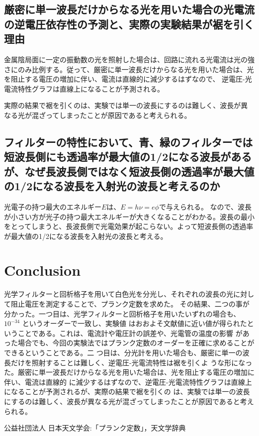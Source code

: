 \documentclass[a4paper,12pt]{jsarticle}
\begin{document}
\subsection{厳密に単一波長だけからなる光を用いた場合の光電流の逆電圧依存性の予測と、実際の実験結果が裾を引く理由}
金属陰局面に一定の振動数の光を照射した場合は、回路に流れる光電流は光の強さにのみ比例する。従って、厳密に単一波長だけからなる光を用いた場合は、光を阻止する電圧の増加に伴い、電流は直線的に減少するはずなので、
逆電圧-光電流特性グラフは直線上になることが予測される。

実際の結果で裾を引くのは、実験では単一の波長にするのは難しく、波長が異なる光が混ざってしまったことが原因であると考えられる。
\subsection{フィルターの特性において、青、緑のフィルターでは短波長側にも透過率が最大値の1/2になる波長があるが、なぜ長波長側ではなく短波長側の透過率が最大値の1/2になる波長を入射光の波長と考えるのか}
光電子の持つ最大のエネルギー$E$は、$E = h\nu = e\phi $で与えられる。
なので、波長が小さい方が光子の持つ最大エネルギーが大きくなることがわかる。波長の最小をとってしまうと、長波長側で光電効果が起こらない。よって短波長側の透過率が最大値の1/2になる波長を入射光の波長と考える。

\section{Conclusion}
光学フィルターと回析格子を用いて白色光を分光し、それぞれの波長の光に対して阻止電圧を測定することで、プランク定数を求めた。
その結果、二つの事が分かった。一つ目は、光学フィルターと回析格子を用いたいずれの場合も、$10^{-34}$ というオーダーで一致し、実験値
はおおよそ文献値に近い値が得られたということである。これは、電流計や電圧計の誤差や、光電管の温度の影響
があった場合でも、今回の実験法ではプランク定数のオーダーを正確に求めることができるということである。二
つ目は、分光計を用いた場合も、厳密に単一の波長だけを照射することは難しく、逆電圧-光電流特性は裾を引くよ
うな形になった。厳密に単一波長だけからなる光を用いた場合は、光を阻止する電圧の増加に伴い、電流は直線的
に減少するはずなので、逆電圧-光電流特性グラフは直線上になることが予測されるが、実際の結果で裾を引くの
は、実験では単一の波長にするのは難しく、波長が異なる光が混ざってしまったことが原因であると考えられる。
\begin{thebibliography}{文献数}
 公益社団法人 日本天文学会:「プランク定数」，天文学辞典
\end{thebibliography}
\end{document}
